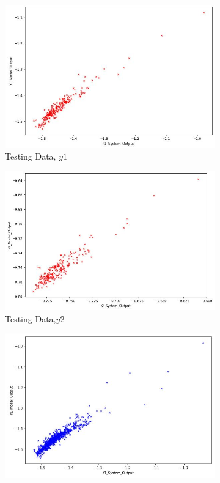 \documentclass[11pt]{article}
\begin{document}
\begin{figure}[h]
\centering
	\begin{subfigure}[b]{0.4\textwidth}
	\centering
	\includegraphics[scale=0.35]{dataset3_k10_lambda0_test1.jpg}
	\caption{Testing Data, $y1$}
	\label{fig:fig3.2.1.1}
	\end{subfigure}
	\hfill
	\begin{subfigure}[b]{0.4\textwidth}
	\centering
	\includegraphics[scale=0.35]{dataset3_k10_lambda0_test2.jpg}
	\caption{Testing Data,$y2$}
	\label{fig:fig3.2.1.2}
	\end{subfigure}
	\hfill
	\begin{subfigure}[b]{0.4\textwidth}
	\centering
	\includegraphics[scale=0.35]{dataset3_k10_lambda0_train1.jpg}

\end{subfigure}
\end{figure}
\end{document}
